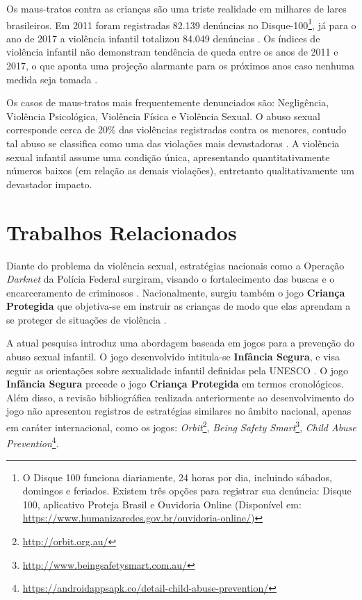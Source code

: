 \documentclass[12pt]{article}
\begin{document}
Os maus-tratos contra as crianças são uma triste realidade em milhares de lares brasileiros. Em 2011 foram registradas 82.139 denúncias no Disque-100\footnote{O Disque 100 funciona diariamente, 24 horas por dia, incluindo sábados, domingos e feriados. Existem três opções para registrar sua denúncia: Disque 100, aplicativo Proteja Brasil e Ouvidoria Online (Disponível em: \url{https://www.humanizaredes.gov.br/ouvidoria-online/})}, já para o ano de 2017 a violência infantil totalizou 84.049 denúncias \cite{DireitosHumanos2018}. Os índices de violência infantil não demonstram  tendência de queda entre os anos de 2011 e 2017, o que aponta uma projeção alarmante para os próximos anos caso nenhuma medida seja tomada \cite{Boletim2018}.

Os casos de maus-tratos mais frequentemente denunciados são: Negligência, Violência Psicológica, Violência Física e Violência Sexual. O abuso sexual corresponde cerca de 20\% das violências registradas contra os menores, contudo tal abuso se classifica como uma das violações mais devastadoras \cite{hockenberry2011wong}. A violência sexual infantil assume uma condição única, apresentando quantitativamente números baixos (em relação as demais violações), entretanto qualitativamente um devastador impacto.


\section{Trabalhos Relacionados}\label{secao:trabalhos}

Diante do problema da violência sexual, estratégias nacionais como a Operação \textit{Darknet} da Polícia Federal surgiram, visando o fortalecimento das buscas e o encarceramento de criminosos \cite{Darknet2017}. Nacionalmente, surgiu também o jogo \textbf{Criança Protegida} que objetiva-se em instruir as crianças de modo que elas aprendam a se proteger de situações de violência \cite{carrara2018criancca}. 

A atual pesquisa introduz uma abordagem baseada em jogos para a prevenção do abuso sexual infantil. O jogo desenvolvido intitula-se \textbf{Infância Segura}, e visa seguir as orientações sobre sexualidade infantil definidas pela UNESCO \cite{women2018international}. O jogo \textbf{Infância Segura} precede o jogo \textbf{Criança Protegida} em termos cronológicos. Além disso, a revisão bibliográfica realizada anteriormente ao desenvolvimento do jogo não apresentou registros de estratégias similares no âmbito nacional, apenas em caráter internacional, como os jogos: \textit{Orbit}\footnote{\url{http://orbit.org.au/}}, 
\textit{Being Safety Smart}\footnote{\url{http://www.beingsafetysmart.com.au/}}, 
\textit{Child Abuse Prevention}\footnote{\url{https://androidappsapk.co/detail-child-abuse-prevention/}}.
\end{document}
